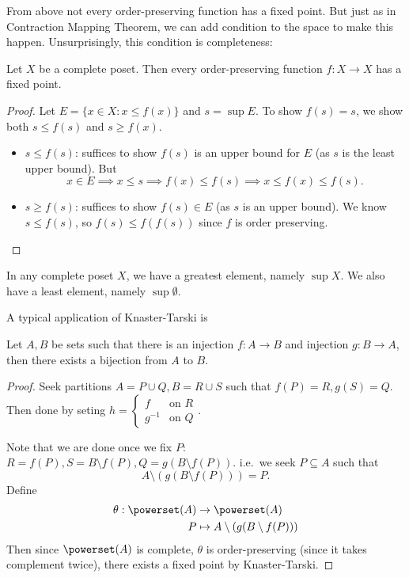 \documentclass[a4paper]{article}
\begin{document}
From above not every order-preserving function has a fixed point. But just as in Contraction Mapping Theorem, we can add condition to the space to make this happen. Unsurprisingly, this condition is completeness:

\begin{theorem}
  \label{thm:Knaster-Tarski}
  Let \(X\) be a complete poset. Then every order-preserving function \(f: X \to X\) has a fixed point.
\end{theorem}

\begin{proof}
  Let \(E = \{x \in X: x \leq f(x)\}\) and \(s = \sup E\). To show \(f(s) = s\), we show both \(s \leq f(s)\) and \(s \geq f(x)\).
  \begin{itemize}
  \item \(s \leq f(s)\): suffices to show \(f(s)\) is an upper bound for \(E\) (as \(s\) is the least upper bound). But
    \[
      x \in E \implies x \leq s \implies f(x) \leq f(s) \implies x \leq f(x) \leq f(s).
    \]
  \item \(s \geq f(s)\): suffices to show \(f(s) \in E\) (as \(s\) is an upper bound). We know \(s \leq f(s)\), so \(f(s) \leq f(f(s))\) since \(f\) is order preserving.
  \end{itemize}
\end{proof}

\begin{note}
  In any complete poset \(X\), we have a greatest element, namely \(\sup X\). We also have a least element, namely \(\sup \emptyset\).
\end{note}

A typical application of Knaster-Tarski is

\begin{theorem}
  Let \(A, B\) be sets such that there is an injection \(f: A \to B\) and injection \(g: B \to A\), then there exists a bijection from \(A\) to \(B\).
\end{theorem}

\begin{proof}
  Seek partitions \(A = P \cup Q, B = R \cup S\) such that \(f(P) = R, g(S) = Q\). Then done by seting \(h = \begin{cases} f & \text{on } R \\ g^{-1} & \text{on } Q \end{cases}\).

  Note that we are done once we fix \(P\): \(R = f(P), S = B \setminus f(P), Q = g(B \setminus f(P))\). i.e.\ we seek \(P \subseteq A\) such that
  \[
    A \setminus (g(B \setminus f(P))) = P.
  \]
  Define
  \begin{align*}
    \theta: \powerset(A) &\to \powerset(A) \\
    P &\mapsto A \setminus (g(B \setminus f(P)))
  \end{align*}
  Then since \(\powerset(A)\) is complete, \(\theta\) is order-preserving (since it takes complement twice), there exists a fixed point by Knaster-Tarski.
\end{proof}
\end{document}
